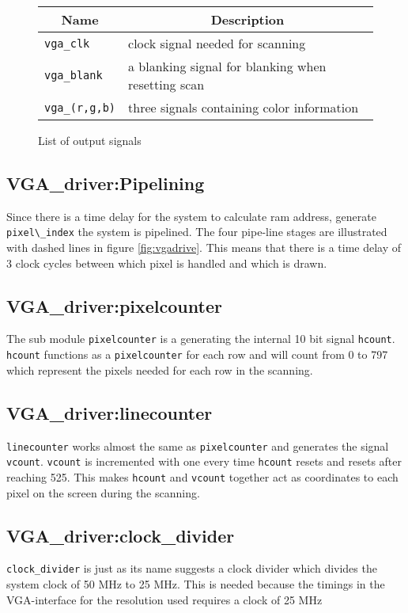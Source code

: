 \begin{figure}[H]
        \centering              
        \caption{List of output signals}
        \label{tab:output}
\begin{tabular}{|l|l|}
        \hline
        \multicolumn{1}{|c|}{Name} & \multicolumn{1}{|c|}{Description} \\
        \hline
        \verb+vga_clk+ & clock signal needed for scanning\\
        \cline{1-2}
        \hline
        \verb+vga_blank+ & a blanking signal for blanking when resetting scan\\
        \cline{1-2}    
        \hline
        \verb+vga_(r,g,b)+ & three signals containing color information\\
        \cline{1-2}    
        \hline
\end{tabular}
\end{figure}

\subsection{VGA\_driver:Pipelining}
Since there is a time delay for the system to calculate ram address, generate \verb=pixel\_index= the system is
pipelined. The four pipe-line stages are illustrated with dashed lines in figure \ref{fig:vgadrive}.
This means that there is a time delay of 3 clock cycles between which pixel is handled and which is drawn. 

\subsection{VGA\_driver:pixelcounter} 
The sub module \verb+pixelcounter+ is a generating the internal 10 bit signal \verb=hcount=. \verb=hcount=
functions as a \verb+pixelcounter+ for each row and will count from 0 to 797 which represent the
pixels needed for each row in the scanning. 
 
\subsection{VGA\_driver:linecounter}
\verb+linecounter+ works almost the same as \verb=pixelcounter= and generates the signal \verb=vcount=. \verb=vcount= is
incremented with one every time \verb=hcount= resets and resets after reaching 525. This makes \verb=hcount= and \verb=vcount= together act as
coordinates to each pixel on the screen during the scanning.

\subsection{VGA\_driver:clock\_divider}
\verb+clock_divider+ is just as its name suggests a clock divider which divides the system clock of 50 MHz
to 25 MHz. This is needed because the timings in the VGA-interface for the resolution used 
requires a clock of 25 MHz 

